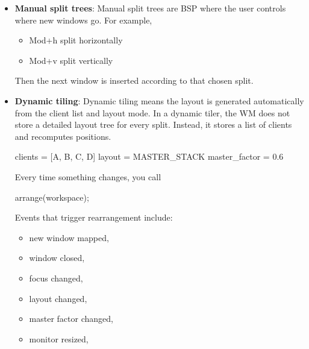 \documentclass{report}
\begin{document}
\begin{itemize}
\begin{cppcode}
{{                            struct {
                                Node* first;
                                Node* second;
                                SplitKind split;
                                float ratio;
                            };
                        };
                    };
                \end{cppcode}
            \item \textbf{Manual split trees}: Manual split trees are BSP where the user controls where new windows go. For example,
                \begin{itemize}
                    \item Mod+h  split horizontally
                    \item Mod+v  split vertically
                \end{itemize}
                Then the next window is inserted according to that chosen split.
            \item \textbf{Dynamic tiling}: Dynamic tiling means the layout is generated automatically from the client list and layout mode.
                \bigbreak \noindent 
                In a dynamic tiler, the WM does not store a detailed layout tree for every split. Instead, it stores a list of clients and recomputes positions.
                \bigbreak \noindent 
                \begin{cppcode}
                    clients = [A, B, C, D]
                    layout = MASTER_STACK
                    master_factor = 0.6
                \end{cppcode}
                \bigbreak \noindent 
                Every time something changes, you call
                \bigbreak \noindent 
                \begin{cppcode}
                arrange(workspace);
                \end{cppcode}
                \bigbreak \noindent 
                Events that trigger rearrangement include:
                \begin{itemize}
                    \item new window mapped,
                    \item window closed,
                    \item focus changed,
                    \item layout changed,
                    \item master factor changed,
                    \item monitor resized,

\end{itemize}
\end{itemize}
\end{document}

